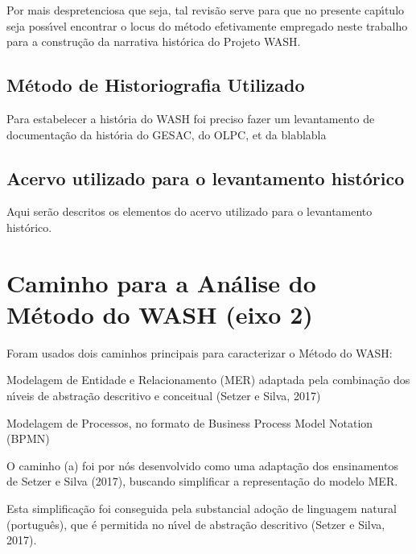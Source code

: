 \documentclass[
12pt,		%
openright,	%
twoside,  %
a4paper,			%
chapter=TITLE,		%
english,			%
french,				%
spanish,			%
brazil				%
]{USPSC-classe/USPSC}
\begin{document}
Por mais despretenciosa que seja, tal revis\~ao serve para que no presente cap\'{\i}tulo seja poss\'{\i}vel encontrar o locus do m\'etodo efetivamente empregado neste trabalho para a constru\c{c}\~ao da narrativa hist\'orica do Projeto WASH.


\subsection[M\'etodo de Historiografia Utilizado ]{M\'etodo de Historiografia Utilizado }\label{M\'etodo de Historiografia Utilizado }
Para estabelecer a hist\'oria do WASH foi preciso fazer um levantamento de documenta\c{c}\~ao da hist\'oria do GESAC, do OLPC, et da blablabla


\subsection[Acervo utilizado para o levantamento hist\'orico]{Acervo utilizado para o levantamento hist\'orico}\label{Acervo utilizado para o levantamento hist\'orico}
Aqui ser\~ao descritos os elementos do acervo utilizado para o levantamento hist\'orico.


\section[Caminho para a An\'alise do M\'etodo do WASH (eixo 2)]{Caminho para a An\'alise do M\'etodo do WASH (eixo 2)}\label{Caminho para a An\'alise do M\'etodo do WASH (eixo 2)}
Foram usados dois caminhos principais para caracterizar o M\'etodo do WASH:



\begin{alineas}
\item Modelagem de Entidade e Relacionamento (MER) adaptada pela combina\c{c}\~ao dos n\'{\i}veis de abstra\c{c}\~ao descritivo e conceitual (Setzer e Silva, 2017)
\item Modelagem de Processos, no formato de Business Process Model Notation (BPMN)
\end{alineas}

O caminho (a) foi por n\'os desenvolvido como uma adapta\c{c}\~ao dos ensinamentos de  Setzer e Silva (2017), buscando simplificar a representa\c{c}\~ao do modelo MER.


Esta simplifica\c{c}\~ao foi conseguida pela substancial ado\c{c}\~ao de linguagem natural (portugu\^es), que \'e permitida no n\'{\i}vel de abstra\c{c}\~ao descritivo (Setzer e Silva, 2017).
\end{document}
